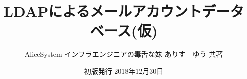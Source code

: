 \title{LDAPによるメールアカウントデータベース(仮)}
\author{AliceSystem インフラエンジニアの毒舌な妹 ありす　ゆう 共著}
\date{初版発行 2018年12月30日}